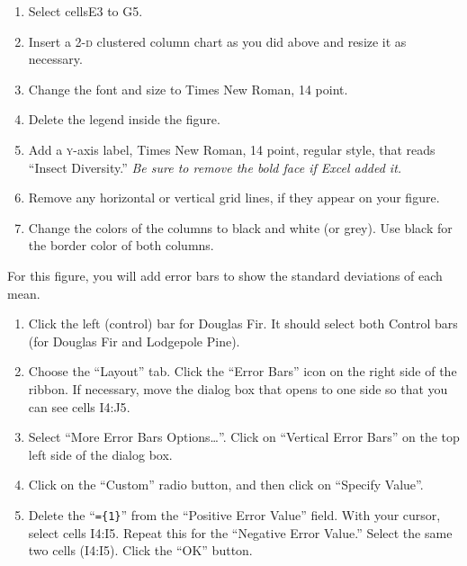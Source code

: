 \documentclass[12pt, hidelinks]{exam}
\newcommand*\axis[1]{{\scshape #1}-axis}
\begin{document}
\begin{questions}
\begin{enumerate}[resume]
	\item Select cells{\liningnum E3 to G5}.

	\item Insert a 2-\textsc{d} clustered column chart as you did above and resize it as necessary.
	
	\item Change the font and size to Times New Roman, 14 point.
	
	\item Delete the legend inside the figure.
	
	\item Add a \axis{y} label, Times New Roman, 14 point, regular style, that reads “Insect Diversity.” \emph{Be sure to remove the bold face if Excel added it.}
	
	\item Remove any horizontal or vertical grid lines, if they appear on your figure.
	
	\item Change the colors of the columns to black and white (or grey). Use black for the border color of both columns.
	
\end{enumerate}

For this figure, you will add error bars to show the standard deviations of each mean.

\begin{enumerate}[resume]

	\item Click the left (control) bar for Douglas Fir. It should select both Control bars (for Douglas Fir and Lodgepole Pine). 
	
	\item Choose the “Layout” tab. Click the “Error Bars” icon on the right side of the ribbon. If necessary, move the dialog box that opens to one side so that you can see cells {\liningnum I4:J5}.
	
	\item Select “More Error Bars Options\dots”. Click on “Vertical Error Bars” on the top left side of the dialog box.
	
	\item Click on the “Custom” radio button, and then click on “Specify Value”.
	
	\item \label{fir_error} Delete the “\texttt{=\{1\}}” from the “Positive Error Value” field. With your cursor, select cells {\liningnum I4:I5}. Repeat this for the “Negative Error Value.” Select the same two cells ({\liningnum I4:I5}). Click the “OK” button.
	

\end{enumerate}
\end{questions}
\end{document}
